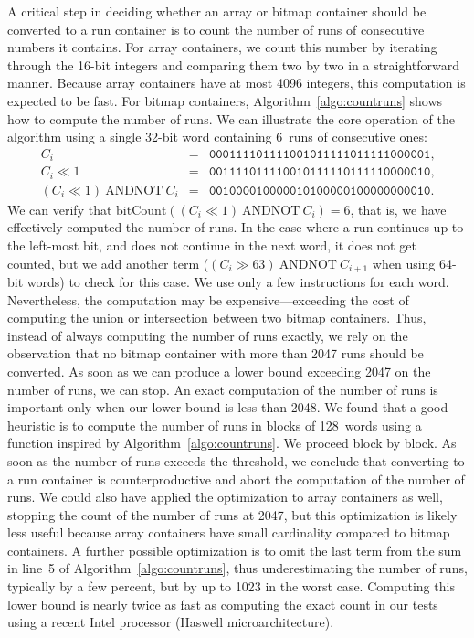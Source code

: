\documentclass[times]{speauth}
\begin{document}
A critical step in deciding whether an array or bitmap container should be converted to a run container is to count the number of runs of consecutive numbers it contains. For array containers, we count  this number by iterating through the 16-bit integers and comparing them two by two in a straightforward manner.
   Because array containers
have at most 4096 integers,
this computation is expected to be fast. For bitmap containers,
Algorithm~\ref{algo:countruns} shows how to compute the number of runs.
We can illustrate the core operation of the algorithm using a single 32-bit word containing
6~runs of consecutive ones:
\begin{eqnarray*}
C_i &=&\texttt{000111101111001011111011111000001},\\
C_i\ll{} 1&=&\texttt{001111011110010111110111110000010},\\
(C_i\ll{} 1) \mathrm{~AND NOT~} C_{i} &=&\texttt{001000010000010100000100000000010}.
\end{eqnarray*}
We can verify that $\mathrm{bitCount}(
(C_i\ll{} 1) \mathrm{~AND NOT~} C_{i} )=6$, that is, we have effectively computed the
number of runs. In the case where a run continues up to the left-most bit, and does not continue in the next word, it does not get counted, but we add another term ($(C_i\gg{}63) \mathrm{~AND NOT~} C_{i+1}$ when using 64-bit words) to check for this case.
We use only a few instructions for each word.
Nevertheless, the computation may be expensive---exceeding
the cost of computing the union or intersection between two bitmap containers.
Thus, instead of always computing the number of runs exactly, 
we rely on the observation that no bitmap container with more than 2047 runs should be converted.
As soon as we can produce a lower bound exceeding 2047 on the number of runs, we can stop.
An exact computation of the number of runs is important only when our lower bound is less than 2048.
We found that a good heuristic is to compute the number of runs in blocks of 128~words using a function inspired by Algorithm~\ref{algo:countruns}. We proceed block by block. As soon as the number of runs exceeds the threshold, we conclude that converting
to a run container is counterproductive and abort the computation of the number of runs.
We could also have applied the optimization to array containers as well, stopping the count of the number of runs at  \num{2047}, but this optimization is likely less useful because array containers have
small cardinality compared to bitmap containers.
 A further possible optimization is to omit the last term
from the sum in line~5 of Algorithm~\ref{algo:countruns}, thus underestimating the number of runs, typically by a few percent, but
by up to 1023 in the worst case. 
Computing this lower bound is nearly twice as fast as computing
the exact count in our tests using a recent Intel processor (Haswell microarchitecture).
\end{document}
